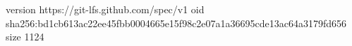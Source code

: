 version https://git-lfs.github.com/spec/v1
oid sha256:bd1cb613ac22ee45fbb0004665e15f98c2e07a1a36695cde13ac64a3179fd656
size 1124
